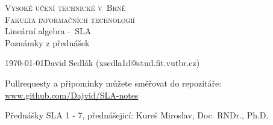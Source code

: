 \documentclass[a4paper, 11pt]{article}
\theoremstyle{break}
\begin{document}
\begin{titlepage}

	\begin{center}
		\textsc{\Huge Vysoké učení technické v~Brně}\\
				  \huge{\textsc{Fakulta informačních technologií}}\\
		{\LARGE 	Lineární algebra\,--\, SLA}\\
				{\Huge Poznámky z přednášek}
	\end{center}
	{\Large\today \hfill David Sedlák (xsedla1d@stud.fit.vutbr.cz)}

	\begin{center}
		Pullrequesty a připomínky můžete směřovat do repozitáře: \url{www.github.com/Dajvid/SLA-notes}
	\end{center}
\end{titlepage}

\tableofcontents










\newpage


\def\refname{Reference}
Přednášky SLA 1 - 7, přednášejicí: Kureš Miroslav, Doc. RNDr., Ph.D.
\end{document}
